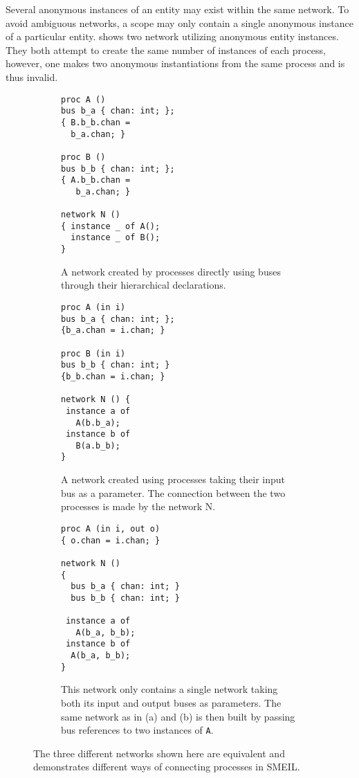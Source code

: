Several anonymous instances of an entity may exist within the same network. To
avoid ambiguous networks, a scope may only contain a single anonymous instance
of a particular entity.   shows two network utilizing
anonymous entity instances. They both attempt to create the same number of
instances of each process, however, one makes two anonymous instantiations from
the same process and is thus invalid.

\begin{figure}
  \centering
  \begin{subfigure}[t]{0.33\textwidth}
    \begin{lstlisting}[language=smeil]
proc A ()
bus b_a { chan: int; };
{ B.b_b.chan =
  b_a.chan; }

proc B ()
bus b_b { chan: int; };
{ A.b_b.chan =
   b_a.chan; }

network N ()
{ instance _ of A();
  instance _ of B();
}
\end{lstlisting}
  \caption{A network created by processes directly using buses through their
    hierarchical declarations.}
  \end{subfigure}
  \begin{subfigure}[t]{0.33\textwidth}
    \begin{lstlisting}[language=smeil]
proc A (in i)
bus b_a { chan: int; };
{b_a.chan = i.chan; }

proc B (in i)
bus b_b { chan: int; }
{b_b.chan = i.chan; }

network N () {
 instance a of
   A(b.b_a);
 instance b of
   B(a.b_b);
}
\end{lstlisting}
    \caption{A network created using processes taking their input bus as a
      parameter. The connection between the two processes is made by the network
      N.}
  \end{subfigure}
  \begin{subfigure}[t]{0.32\textwidth}
    \begin{lstlisting}[language=smeil]
proc A (in i, out o)
{ o.chan = i.chan; }

network N ()
{
  bus b_a { chan: int; }
  bus b_b { chan: int; }

 instance a of
   A(b_a, b_b);
 instance b of
  A(b_a, b_b);
}
\end{lstlisting}
    \caption{This network only contains a single network taking both its input
      and output buses as parameters. The same network as in (a) and (b) is then
      built by passing bus references to two instances of {\tt A}.}
    
  \end{subfigure}

  \caption{The three different networks shown here are equivalent and
    demonstrates different ways of connecting processes in SMEIL.}
  \label{fig:comms}
\end{figure}

